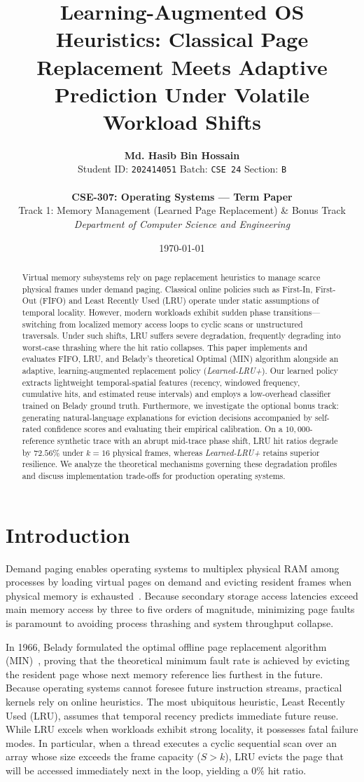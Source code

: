 \documentclass[10pt,twocolumn,a4paper]{article}
\title{\textbf{Learning-Augmented OS Heuristics: Classical Page Replacement Meets Adaptive Prediction Under Volatile Workload Shifts}}
\author{
    \textbf{Md. Hasib Bin Hossain} \\
    Student ID: \texttt{202414051} \quad Batch: \texttt{CSE 24} \quad Section: \texttt{B} \\
    \vspace{0.2em} \\
    \textbf{CSE-307: Operating Systems --- Term Paper} \\
    Track 1: Memory Management (Learned Page Replacement) \& Bonus Track \\
    \textit{Department of Computer Science and Engineering}
}
\date{\today}
\begin{document}
\maketitle

\begin{abstract}
Virtual memory subsystems rely on page replacement heuristics to manage scarce physical frames under demand paging. Classical online policies such as First-In, First-Out (FIFO) and Least Recently Used (LRU) operate under static assumptions of temporal locality. However, modern workloads exhibit sudden phase transitions---switching from localized memory access loops to cyclic scans or unstructured traversals. Under such shifts, LRU suffers severe degradation, frequently degrading into worst-case thrashing where the hit ratio collapses. This paper implements and evaluates FIFO, LRU, and Belady's theoretical Optimal (MIN) algorithm alongside an adaptive, learning-augmented replacement policy (\textit{Learned-LRU+}). Our learned policy extracts lightweight temporal-spatial features (recency, windowed frequency, cumulative hits, and estimated reuse intervals) and employs a low-overhead classifier trained on Belady ground truth. Furthermore, we investigate the optional bonus track: generating natural-language explanations for eviction decisions accompanied by self-rated confidence scores and evaluating their empirical calibration. On a $10{,}000$-reference synthetic trace with an abrupt mid-trace phase shift, LRU hit ratios degrade by $72.56\%$ under $k=16$ physical frames, whereas \textit{Learned-LRU+} retains superior resilience. We analyze the theoretical mechanisms governing these degradation profiles and discuss implementation trade-offs for production operating systems.
\end{abstract}

\section{Introduction}
Demand paging enables operating systems to multiplex physical RAM among processes by loading virtual pages on demand and evicting resident frames when physical memory is exhausted~\cite{denning1968working}. Because secondary storage access latencies exceed main memory access by three to five orders of magnitude, minimizing page faults is paramount to avoiding process thrashing and system throughput collapse.

In 1966, Belady formulated the optimal offline page replacement algorithm (MIN)~\cite{belady1966study}, proving that the theoretical minimum fault rate is achieved by evicting the resident page whose next memory reference lies furthest in the future. Because operating systems cannot foresee future instruction streams, practical kernels rely on online heuristics. The most ubiquitous heuristic, Least Recently Used (LRU), assumes that temporal recency predicts immediate future reuse. While LRU excels when workloads exhibit strong locality, it possesses fatal failure modes. In particular, when a thread executes a cyclic sequential scan over an array whose size exceeds the frame capacity ($S > k$), LRU evicts the page that will be accessed immediately next in the loop, yielding a $0\%$ hit ratio.
\end{document}
